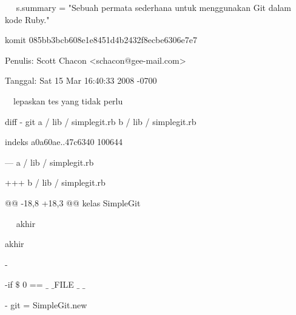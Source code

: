 \noindent 
 \hspace*{0.5in}  $  $ $  $ $  $ $  $ $  $s.summary = "Sebuah permata sederhana untuk menggunakan Git dalam kode Ruby." \par
\noindent 
 \hspace*{0.5in} komit 085bb3bcb608e1e8451d4b2432f8ecbe6306e7e7 \par
\noindent 
 \hspace*{0.5in} Penulis: Scott Chacon <schacon@gee-mail.com> \par
\noindent 
 \hspace*{0.5in} Tanggal: Sat 15 Mar 16:40:33 2008 -0700 \par
\noindent 
 \hspace*{0.5in}  $  $ $  $ $  $ $  $lepaskan tes yang tidak perlu \par
\noindent 
 \hspace*{0.5in}  \hspace*{0.5in} diff - git a / lib / simplegit.rb b / lib / simplegit.rb \par
\noindent 
 \hspace*{0.5in}  \hspace*{0.5in} indeks a0a60ae..47c6340 100644 \par
\noindent 
 \hspace*{0.5in}  \hspace*{0.5in} --- a / lib / simplegit.rb \par
\noindent 
 \hspace*{0.5in}  \hspace*{0.5in} +++ b / lib / simplegit.rb \par
\noindent 
 \hspace*{0.5in}  \hspace*{0.5in} @@ -18,8 +18,3 @@ kelas SimpleGit \par
\noindent 
 \hspace*{0.5in}  \hspace*{0.5in}  $  $ $  $ $  $ $  $ $  $akhir \par
\noindent 
 \hspace*{0.5in}  $  $akhir \par
\noindent 
 \hspace*{0.5in} - \par
\noindent 
 \hspace*{0.5in} -if  $  \$  $ 0 ==  $  \_  $ $  \_  $FILE $  \_  $ $  \_  $ \par
\noindent 
 \hspace*{0.5in} - git = SimpleGit.new \par
